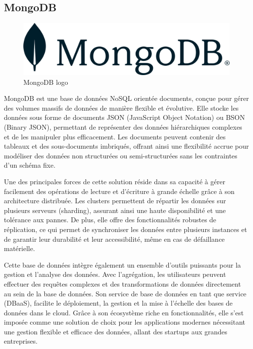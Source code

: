 \documentclass[a4paper,12pt]{report}
\numberwithin{equation}{section}
\begin{document}
\subsection{MongoDB}
\begin{figure}[H]
    \centering
    \includegraphics[width=\textwidth]{tech/mongodb.png}
    \caption{MongoDB logo}
    \label{fig:MongoDB logo}
\end{figure}
\par
MongoDB est une base de données NoSQL orientée documents, conçue pour gérer des volumes massifs de données de manière flexible et évolutive. Elle stocke les données sous forme de documents JSON (JavaScript Object Notation) ou BSON (Binary JSON), permettant de représenter des données hiérarchiques complexes et de les manipuler plus efficacement. Les documents peuvent contenir des tableaux et des sous-documents imbriqués, offrant ainsi une flexibilité accrue pour modéliser des données non structurées ou semi-structurées sans les contraintes d'un schéma fixe.
\\ \par
Une des principales forces de cette solution réside dans sa capacité à gérer facilement des opérations de lecture et d'écriture à grande échelle grâce à son architecture distribuée. Les clusters permettent de répartir les données sur plusieurs serveurs (sharding), assurant ainsi une haute disponibilité et une tolérance aux pannes. De plus, elle offre des fonctionnalités robustes de réplication, ce qui permet de synchroniser les données entre plusieurs instances et de garantir leur durabilité et leur accessibilité, même en cas de défaillance matérielle.
\\ \par
Cette base de données intègre également un ensemble d'outils puissants pour la gestion et l'analyse des données. Avec l'agrégation, les utilisateurs peuvent effectuer des requêtes complexes et des transformations de données directement au sein de la base de données. Son service de base de données en tant que service (DBaaS), facilite le déploiement, la gestion et la mise à l'échelle des bases de données dans le cloud. Grâce à son écosystème riche en fonctionnalités, elle s'est imposée comme une solution de choix pour les applications modernes nécessitant une gestion flexible et efficace des données, allant des startups aux grandes entreprises.
\newpage
\end{document}
